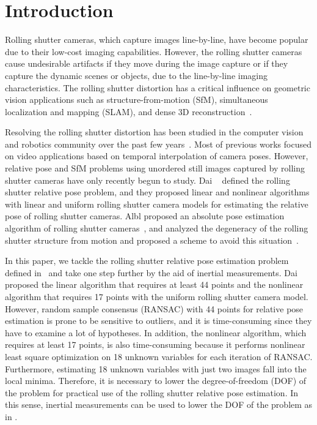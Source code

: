 \documentclass[10pt,twocolumn,letterpaper]{article}
\theoremstyle{definition}
\begin{document}
	
	\section{Introduction}\label{sec:intro}
	
	Rolling shutter cameras, which capture images line-by-line, have become popular due to their low-cost imaging capabilities.
	However, the rolling shutter cameras cause undesirable artifacts if they move during the image capture or if they capture the dynamic scenes or objects, due to the line-by-line imaging characteristics.
	The rolling shutter distortion has a critical influence on geometric vision applications such as structure-from-motion (SfM), simultaneous localization and mapping (SLAM), and dense 3D reconstruction~\cite{Albl:ECCV:2016}.
	
	Resolving the rolling shutter distortion has been studied in the computer vision and robotics community over the past few years~\cite{Hedborg:ICCVW:2011,Hedborg:CVPR:2012,Saurer:ICCV:2013,Guo:RSS:2014,Kim:ICRA:2016}.
	Most of previous works focused on video applications based on temporal interpolation of camera poses.
	However, relative pose and SfM problems using unordered still images captured by rolling shutter cameras have only recently begun to study.
	Dai \etal~\cite{Dai:CVPR:2016} defined the rolling shutter relative pose problem,
	and they proposed linear and nonlinear algorithms with linear and uniform rolling shutter camera models for estimating the relative pose of rolling shutter cameras.
	Albl \etal proposed an absolute pose estimation algorithm of rolling shutter cameras~\cite{Albl:CVPR:2015}, and analyzed the degeneracy of the rolling shutter structure from motion and proposed a scheme to avoid this situation~\cite{Albl:ECCV:2016}.
	
	
	In this paper, we tackle the rolling shutter relative pose estimation problem defined in~\cite{Dai:CVPR:2016} and take one step further by the aid of inertial measurements.
	Dai \etal proposed the linear algorithm that requires at least 44 points and the nonlinear algorithm that requires 17 points with the uniform rolling shutter camera model.
	However, random sample consensus (RANSAC) with 44 points for relative pose estimation is prone to be sensitive to outliers, and it is time-consuming since they have to examine a lot of hypotheses.
	In addition, the nonlinear algorithm, which requires at least 17 points, is also time-consuming because it performs nonlinear least square optimization on 18 unknown variables for each iteration of RANSAC.
	Furthermore, estimating 18 unknown variables with just two images fall into the local minima.
	Therefore, it is necessary to lower the degree-of-freedom (DOF) of the problem for practical use of the rolling shutter relative pose estimation.
	In this sense, inertial measurements can be used to lower the DOF of the problem as in \cite{Fraundorfer:ECCV:2010, Lee:CVPR:2014, Albl:CVPR:2016}. 
	
\end{document}
